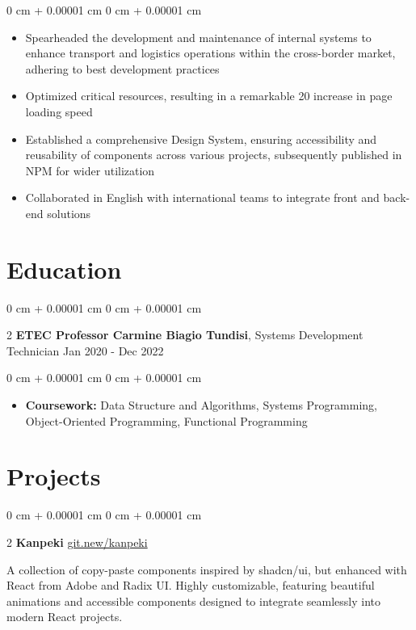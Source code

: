 \documentclass[10pt, letterpaper]{article}
\newenvironment{highlights}{ \begin{itemize}[ topsep=0.10 cm, parsep=0.10 cm, partopsep=0pt,
itemsep=0pt, leftmargin=0 cm + 10pt ] }{ \end{itemize} } %
\newenvironment{onecolentry}{ \begin{adjustwidth}{ 0 cm + 0.00001 cm }{ 0 cm + 0.00001 cm }
}{ \end{adjustwidth} } %
\newenvironment{twocolentry}[2][]{ \onecolentry \def\secondColumn{#2} \setcolumnwidth{\fill, 4.5 cm}
\begin{paracol}{2} }{ \switchcolumn \raggedleft \secondColumn \end{paracol}
\endonecolentry } %
\begin{document}
	\vspace{0.10 cm}
	\begin{onecolentry}
		\begin{highlights}
			\item Spearheaded the development and maintenance of internal
			systems to enhance transport and logistics operations
			within the cross-border market, adhering to best
			development practices
			\item Optimized critical resources, resulting in a remarkable 20%
			increase in page loading speed
			\item Established a comprehensive Design System, ensuring
			accessibility and reusability of components across various
			projects, subsequently published in NPM for wider
			utilization
			\item Collaborated in English with international teams to integrate
			front and back-end solutions
		\end{highlights}
	\end{onecolentry}

	\section{Education}

	\begin{twocolentry}
		{ Jan 2020 - Dec 2022 } \textbf{ETEC Professor Carmine Biagio Tundisi}, Systems
		Development Technician
	\end{twocolentry}

	\vspace{0.10 cm}
	\begin{onecolentry}
		\begin{highlights}
			\item \textbf{Coursework:} Data Structure and Algorithms, Systems Programming,
			Object-Oriented Programming, Functional Programming
		\end{highlights}
	\end{onecolentry}

	\section{Projects}

	\begin{twocolentry}
		{\href{https://git.new/kanpeki}{git.new/kanpeki}} \textbf{Kanpeki}
	\end{twocolentry}

	\vspace{0.10cm}
	A collection of copy-paste components inspired by shadcn/ui, but enhanced with
	React from Adobe and Radix UI. Highly customizable, featuring beautiful
	animations and accessible components designed to integrate seamlessly into
	modern React projects.
\end{document}
